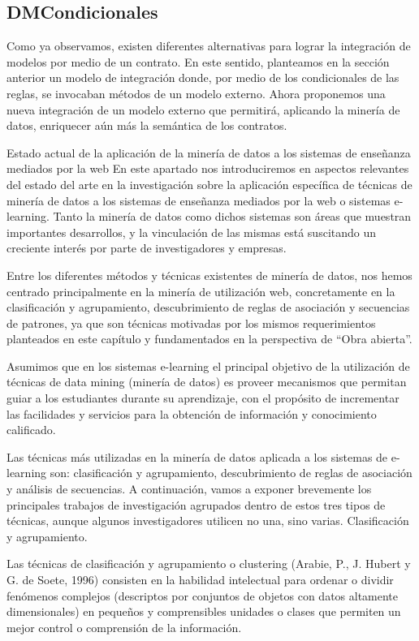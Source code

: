 \subsection{DMCondicionales}

Como ya observamos, existen diferentes alternativas para lograr la integración
de modelos por medio de un contrato. En este sentido, planteamos en
la sección anterior un modelo de integración donde, por medio de los condicionales
de las reglas, se invocaban métodos de un modelo externo.
Ahora proponemos una nueva integración de un modelo externo que permitirá,
aplicando la minería de datos, enriquecer aún más la semántica de
los contratos.

Estado actual de la aplicación de la minería de datos a los sistemas
de enseñanza mediados por la web
En este apartado nos introduciremos en aspectos relevantes del estado del arte
en la investigación sobre la aplicación específica de técnicas de minería de
datos a los sistemas de enseñanza mediados por la web o sistemas e-learning.
Tanto la minería de datos como dichos sistemas son áreas que muestran
importantes desarrollos, y la vinculación de las mismas está suscitando un creciente
interés por parte de investigadores y empresas.

Entre los diferentes métodos y técnicas existentes de minería de datos,
nos hemos centrado principalmente en la minería de utilización web, concretamente
en la clasificación y agrupamiento, descubrimiento de reglas de asociación
y secuencias de patrones, ya que son técnicas motivadas por los
mismos requerimientos planteados en este capítulo y fundamentados en la
perspectiva de “Obra abierta”.

Asumimos que en los sistemas e-learning el principal objetivo de la utilización
de técnicas de data mining (minería de datos) es proveer mecanismos
que permitan guiar a los estudiantes durante su aprendizaje, con el propósito
de incrementar las facilidades y servicios para la obtención de información y
conocimiento calificado.

Las técnicas más utilizadas en la minería de datos aplicada a los sistemas
de e-learning son: clasificación y agrupamiento, descubrimiento de reglas de
asociación y análisis de secuencias. A continuación, vamos a exponer brevemente
los principales trabajos de investigación agrupados dentro de estos tres
tipos de técnicas, aunque algunos investigadores utilicen no una, sino varias.
Clasificación y agrupamiento.

Las técnicas de clasificación y agrupamiento o clustering (Arabie, P., J. Hubert
y G. de Soete, 1996) consisten en la habilidad intelectual para ordenar o dividir
fenómenos complejos (descriptos por conjuntos de objetos con datos altamente
dimensionales) en pequeños y comprensibles unidades o clases que
permiten un mejor control o comprensión de la información.

